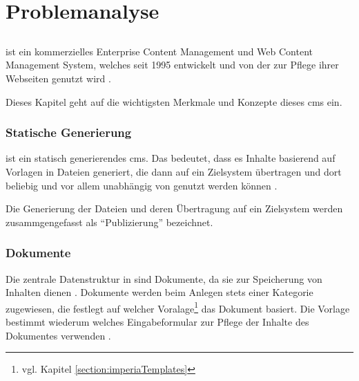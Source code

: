 \chapter{Problemanalyse}
    \label{chapter:ProblemAnalysis}
    \section{\imperia}
        {\imperia} ist ein kommerzielles Enterprise Content Management und
        Web Content Management System, welches seit 1995 entwickelt
        \cite{imperia:about, imperia:historie} und von 
        der {\fernUni} zur Pflege ihrer Webseiten genutzt wird
        \cite{fernUni:imperia}.
        
        Dieses Kapitel geht auf die wichtigsten Merkmale und Konzepte
        dieses \gls{cms} ein.

        \subsection{Statische Generierung}
            \label{section:imperiaStaticGeneration}
            {\imperia} ist ein statisch generierendes \gls{cms}.
            Das bedeutet, dass es Inhalte basierend auf Vorlagen
            in Dateien generiert, die dann auf ein Zielsystem übertragen
            und dort beliebig und vor allem unabhängig von
            {\imperia} genutzt werden können
            \cite[Kapitel 1.1]{imperia:ecmd}.

            Die Generierung der Dateien und deren Übertragung auf ein Zielsystem
            werden zusammgengefasst als "`Publizierung"' bezeichnet.


        \subsection{Dokumente}
            \label{section:imperiaDocuments}
            Die zentrale Datenstruktur in {\imperia} sind Dokumente,
            da sie zur Speicherung von Inhalten dienen
            \cite[Kapitel 1.1]{imperia:ecmd}.
            Dokumente werden beim Anlegen stets einer Kategorie zugewiesen,
            die festlegt auf welcher Voralage\footnote{vgl. Kapitel \ref{section:imperiaTemplates}}
            das Dokument basiert.
            Die Vorlage bestimmt wiederum welches Eingabeformular
            {\editors} zur Pflege der Inhalte des Dokumentes verwenden
            \cite[Kapitel 1.1.4]{imperia:ecmd}.
            

